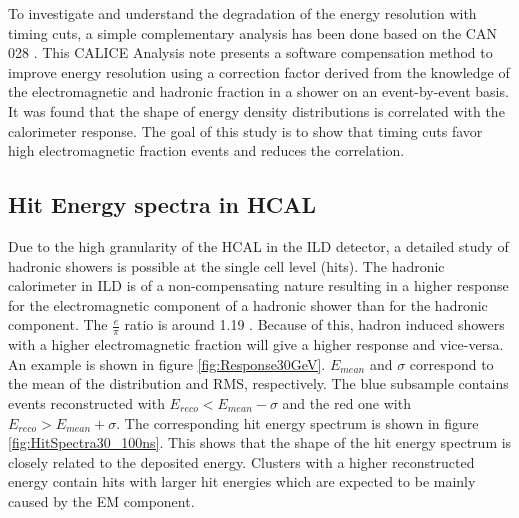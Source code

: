 To investigate and understand the degradation of the energy resolution with timing cuts, a simple complementary analysis has been done based on the CAN 028 \cite{CaN028}. This CALICE Analysis note presents a software compensation method to improve energy resolution using a correction factor derived from the knowledge of the electromagnetic and hadronic fraction in a shower on an event-by-event basis. It was found that the shape of energy density distributions is correlated with the calorimeter response. The goal of this study is to show that timing cuts favor high electromagnetic fraction events and reduces the correlation.

\subsection{Hit Energy spectra in HCAL}

Due to the high granularity of the HCAL in the ILD detector, a detailed study of hadronic showers is possible at the single cell level (hits). The hadronic calorimeter in ILD is of a non-compensating nature resulting in a higher response for the electromagnetic component of a hadronic shower than for the hadronic component. The $\frac{e}{\pi}$ ratio is around 1.19 \cite{}. Because of this, hadron induced showers with a higher electromagnetic fraction will give a higher response and vice-versa. An example is shown in figure \ref{fig:Response30GeV}. $E_{mean}$ and $\sigma$ correspond to the mean of the distribution and RMS, respectively. The blue subsample contains events reconstructed with $E_{reco} < E_{mean} - \sigma$ and the red one with $E_{reco} > E_{mean} + \sigma$. The corresponding hit energy spectrum is shown in figure \ref{fig:HitSpectra30_100ns}. This shows that the shape of the hit energy spectrum is closely related to the deposited energy. Clusters with a higher reconstructed energy contain hits with larger hit energies which are expected to be mainly caused by the EM component.

